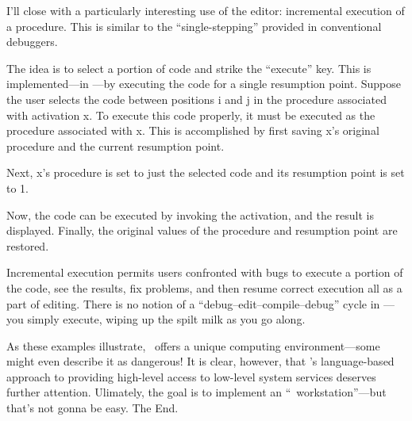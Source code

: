 I'll close with a particularly interesting use of the editor:
incremental execution of a procedure.
This is similar to the ``single-stepping'' provided in
conventional debuggers.

The idea is to select a portion of code and strike the ``execute'' key.
This is implemented---in \EZ---by executing the code for a
single resumption point.
Suppose the user selects the code
between positions {\pt i \rm and \pt j} in the
procedure associated with activation {\pt x}.
To execute this code properly, it must be executed
as the procedure associated with {\pt x}.
This is accomplished by first saving {\pt x}'s original procedure
and the current resumption point.

Next, {\pt x}'s procedure is set to just the selected code
and its resumption point is set to 1.

Now, the code can be executed by invoking the activation,
and the result is displayed.
Finally, the original values of the procedure and resumption
point are restored.

Incremental execution permits users confronted with bugs
to execute a portion of the code, see the results, fix
problems, and then resume correct execution all as a part of editing.
There is no notion of a ``debug--edit--compile--debug''
cycle in \EZ---you simply execute, wiping up the
spilt milk as you go along.

As these examples illustrate, \EZ\ offers a unique computing
environment---some might even describe it as dangerous!
It is clear, however, that \EZ's language-based approach
to providing high-level access to low-level
system services deserves further attention.
Ulimately, the goal is to implement an ``\EZ\ workstation''---but
that's not gonna be easy.
The End.
\bye
